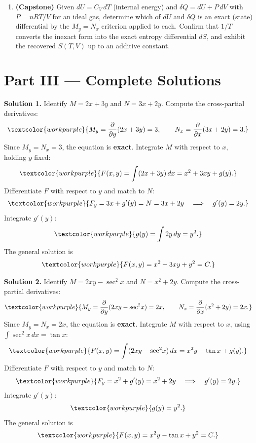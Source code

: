 \begin{enumerate}[leftmargin=2em, itemsep=8pt]
    \item \textbf{(Capstone)} Given $dU = C_V\,dT$ (internal energy) and
          $\delta Q = dU + P\,dV$ with $P = nRT/V$ for an ideal gas, determine
          which of $dU$ and $\delta Q$ is an exact (state) differential by the
          $M_y = N_x$ criterion applied to each. Confirm that $1/T$ converts
          the inexact form into the exact entropy differential $dS$, and
          exhibit the recovered $S(T,V)$ up to an additive constant.

\end{enumerate}

\clearpage
{}
{}
\section*{Part III --- Complete Solutions}

\noindent\textbf{Solution 1.}\quad
Identify $M = 2x + 3y$ and $N = 3x + 2y$. Compute the cross-partial
derivatives:
\[
  \textcolor{workpurple}{M_y = \frac{\partial}{\partial y}(2x + 3y) = 3,
  \qquad
  N_x = \frac{\partial}{\partial x}(3x + 2y) = 3.}
\]
Since $M_y = N_x = 3$, the equation is \textbf{exact}.
Integrate $M$ with respect to $x$, holding $y$ fixed:
\[
  \textcolor{workpurple}{F(x,y) = \int(2x + 3y)\,dx = x^2 + 3xy + g(y).}
\]
Differentiate $F$ with respect to $y$ and match to $N$:
\[
  \textcolor{workpurple}{F_y = 3x + g'(y) = N = 3x + 2y
  \quad\Longrightarrow\quad g'(y) = 2y.}
\]
Integrate $g'(y)$:
\[
  \textcolor{workpurple}{g(y) = \int 2y\,dy = y^2.}
\]
The general solution is
\[
  \textcolor{workpurple}{F(x,y) = x^2 + 3xy + y^2 = C.}
\]

\medskip

\noindent\textbf{Solution 2.}\quad
Identify $M = 2xy - \sec^2\!x$ and $N = x^2 + 2y$. Compute the
cross-partial derivatives:
\[
  \textcolor{workpurple}{M_y = \frac{\partial}{\partial y}(2xy - \sec^2\!x) = 2x,
  \qquad
  N_x = \frac{\partial}{\partial x}(x^2 + 2y) = 2x.}
\]
Since $M_y = N_x = 2x$, the equation is \textbf{exact}.
Integrate $M$ with respect to $x$, using $\int\sec^2\!x\,dx = \tan x$:
\[
  \textcolor{workpurple}{F(x,y)
  = \int(2xy - \sec^2\!x)\,dx
  = x^2 y - \tan x + g(y).}
\]
Differentiate $F$ with respect to $y$ and match to $N$:
\[
  \textcolor{workpurple}{F_y = x^2 + g'(y) = x^2 + 2y
  \quad\Longrightarrow\quad g'(y) = 2y.}
\]
Integrate $g'(y)$:
\[
  \textcolor{workpurple}{g(y) = y^2.}
\]
The general solution is
\[
  \textcolor{workpurple}{F(x,y) = x^2 y - \tan x + y^2 = C.}
\]

